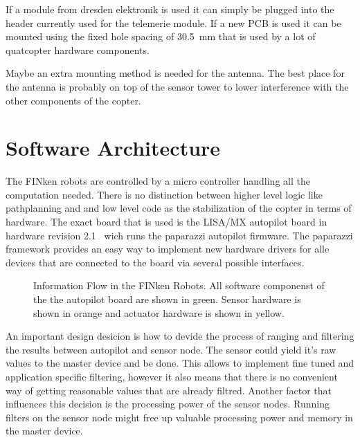 If a module from dresden elektronik is used it can simply be plugged into the header currently used for the telemerie module.
If a new PCB is used it can be mounted using the fixed hole spacing of \SI{30.5}{mm} that is used by a lot of quatcopter hardware components.

Maybe an extra mounting method is needed for the antenna.
The best place for the antenna is probably on top of the sensor tower to lower interference with the other components of the copter.

\section{Software Architecture}
The FINken robots are controlled by a micro controller handling all the computation needed.
There is no distinction between higher level logic like pathplanning and and low level code as the stabilization of the copter in terms of hardware.
The exact board that is used is the LISA/MX autopilot board in hardware revision 2.1~\cite{lisamx} wich runs the paparazzi autopilot firmware\cite{paparazzi}.
The paparazzi framework provides an easy way to implement new hardware drivers for alle devices that are connected to the board via several possible interfaces.

\begin{figure}[H]
	\centering	
	\label{flow}
	\caption[ Information Flow in the FINken Robots ]
	{Information Flow in the FINken Robots. 
	All software componenst of the the autopilot board are shown in green.
	Sensor hardware is shown in orange and actuator hardware is shown in yellow.}
\end{figure}

An important design desicion is how to devide the process of ranging and filtering the results between autopilot and sensor node.
The sensor could yield it's raw values to the master device and be done.
This allows to implement fine tuned and application specific filtering, however it also means that there is no convenient way of getting reasonable values that are already filtred.
Another factor that influences this decision is the processing power of the sensor nodes.
Running filters on the sensor node might free up valuable processing power and memory in the master device.

